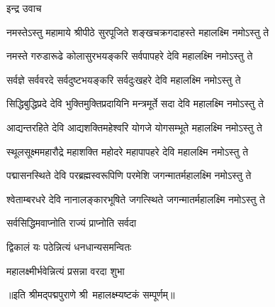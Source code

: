 
\centerline{इन्द्र उवाच}
\twolineshloka
{नमस्तेऽस्तु महामाये श्रीपीठे सुरपूजिते}
{शङ्खचक्रगदाहस्ते महालक्ष्मि नमोऽस्तु ते}

\twolineshloka
{नमस्ते गरुडारूढे कोलासुरभयङ्करि}
{सर्वपापहरे देवि महालक्ष्मि नमोऽस्तु ते}

\twolineshloka
{सर्वज्ञे सर्ववरदे सर्वदुष्टभयङ्करि}
{सर्वदुःखहरे देवि महालक्ष्मि नमोऽस्तु ते}

\twolineshloka
{सिद्धिबुद्धिप्रदे देवि भुक्तिमुक्तिप्रदायिनि}
{मन्त्रमूर्ते सदा देवि महालक्ष्मि नमोऽस्तु ते}

\twolineshloka
{आद्यन्तरहिते देवि आद्यशक्तिमहेश्वरि}
{योगजे योगसम्भूते महालक्ष्मि नमोऽस्तु ते}

\twolineshloka
{स्थूलसूक्ष्ममहारौद्रे महाशक्ति महोदरे}
{महापापहरे देवि महालक्ष्मि नमोऽस्तु ते}

\twolineshloka
{पद्मासनस्थिते देवि परब्रह्मस्वरूपिणि}
{परमेशि जगन्मातर्महालक्ष्मि नमोऽस्तु ते}

\twolineshloka
{श्वेताम्बरधरे देवि नानालङ्कारभूषिते}
{जगत्स्थिते जगन्मातर्महालक्ष्मि नमोऽस्तु ते}

{सर्वसिद्धिमवाप्नोति राज्यं प्राप्नोति सर्वदा}

{द्विकालं यः पठेन्नित्यं धनधान्यसमन्वितः}

{महालक्ष्मीर्भवेन्नित्यं प्रसन्ना वरदा शुभा}

॥इति श्रीमद्पद्मपुराणे श्री~महालक्ष्म्यष्टकं सम्पूर्णम्॥